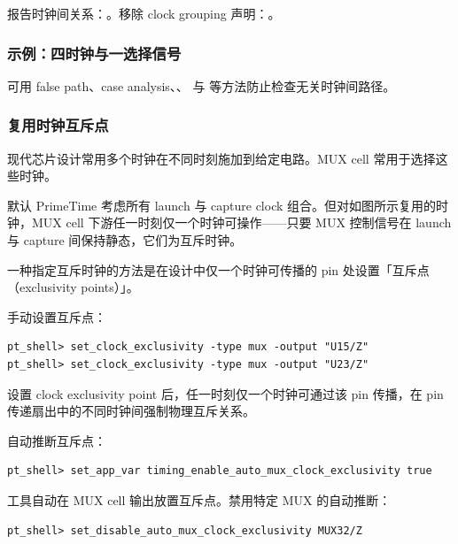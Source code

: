 报告时钟间关系：。移除 clock grouping 声明：。

\subsubsection{示例：四时钟与一选择信号}

可用 false path、case analysis、、 与  等方法防止检查无关时钟间路径。

\subsubsection{复用时钟互斥点}
现代芯片设计常用多个时钟在不同时刻施加到给定电路。MUX cell 常用于选择这些时钟。


默认 PrimeTime 考虑所有 launch 与 capture clock 组合。但对如图所示复用的时钟，MUX cell 下游任一时刻仅一个时钟可操作——只要 MUX 控制信号在 launch 与 capture 间保持静态，它们为互斥时钟。

一种指定互斥时钟的方法是在设计中仅一个时钟可传播的 pin 处设置「互斥点（exclusivity points）」。


手动设置互斥点：
\begin{lstlisting}
pt_shell> set_clock_exclusivity -type mux -output "U15/Z"
pt_shell> set_clock_exclusivity -type mux -output "U23/Z"
\end{lstlisting}

设置 clock exclusivity point 后，任一时刻仅一个时钟可通过该 pin 传播，在 pin 传递扇出中的不同时钟间强制物理互斥关系。

自动推断互斥点：
\begin{lstlisting}
pt_shell> set_app_var timing_enable_auto_mux_clock_exclusivity true
\end{lstlisting}

工具自动在 MUX cell 输出放置互斥点。禁用特定 MUX 的自动推断：
\begin{lstlisting}
pt_shell> set_disable_auto_mux_clock_exclusivity MUX32/Z
\end{lstlisting}

